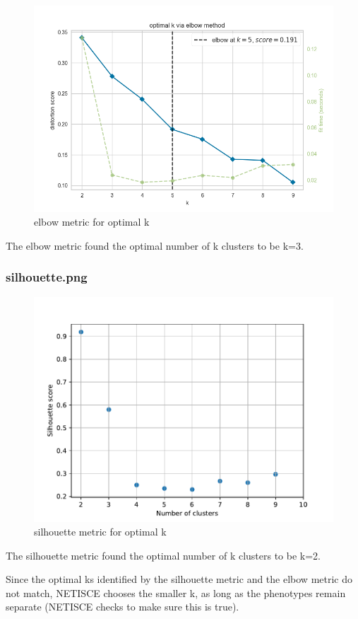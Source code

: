 \documentclass[
]{book}
\begin{document}
\begin{figure}

{\centering \includegraphics[width=0.5\linewidth]{results/elbow} 

}

\caption{elbow metric for optimal k}\label{fig:unnamed-chunk-11}
\end{figure}

The elbow metric found the optimal number of k clusters to be k=3.

\hypertarget{section-id}{%
\subsubsection*{silhouette.png}\label{section-id}}

\begin{figure}

{\centering \includegraphics[width=0.5\linewidth]{results/silhouette} 

}

\caption{silhouette metric for optimal k}\label{fig:unnamed-chunk-12}
\end{figure}

The silhouette metric found the optimal number of k clusters to be k=2.

Since the optimal ks identified by the silhouette metric and the elbow metric do not match, NETISCE chooses the smaller k, as long as the phenotypes remain separate (NETISCE checks to make sure this is true).
\end{document}
